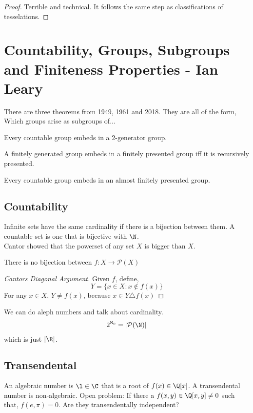 \documentclass{article}
\begin{document}
\begin{proof}
  Terrible and technical. It follows the same step as classifications of tesselations.
\end{proof}

\section{Countability, Groups, Subgroups and Finiteness Properties - Ian Leary}

There are three theorems from 1949, 1961 and 2018. They are all of the form,
Which groups arise as subgroups of...\\

\begin{nthm}
  Every countable group embeds in a 2-generator group.
\end{nthm}

\begin{nthm}[Higman, 1961]
  A finitely generated group embeds in a finitely presented group iff it is recursively presented.
\end{nthm}

\begin{nthm}
  Every countable group embeds in an almost finitely presented group.
\end{nthm}


\subsection{Countability}
Infinite sets have the same cardinality if there is a bijection between them. A countable set is one that is bijective with $\N$.\\
Cantor showed that the powerset of any set $X$ is bigger than $X$.

\begin{nthm}
  There is no bijection between $f : X \to \mathcal{P}(X)$
\end{nthm}
\begin{proof}[Cantors Diagonal Argument]
  Given $f$, define,
  $$ Y = \{x \in X : x \notin f(x)\} $$
  For any $x \in X$, $Y \ne f(x)$, because $x \in Y \triangle f(x)$
\end{proof}

We can do aleph numbers and talk about cardinality.
$$ 2^{\aleph_0} = |\mathcal{P}(\N)| $$
which is just $|\R|$.

\subsection{Transendental}
An algebraic number is $\l \in \C$ that is a root of $f(x) \in \Q[x]$. A transendental number is non-algebraic. Open problem: If there a $f(x, y) \in \Q[x, y] \ne 0$ such that, $f(e, \pi) = 0$. Are they transendentally independent?
\end{document}
